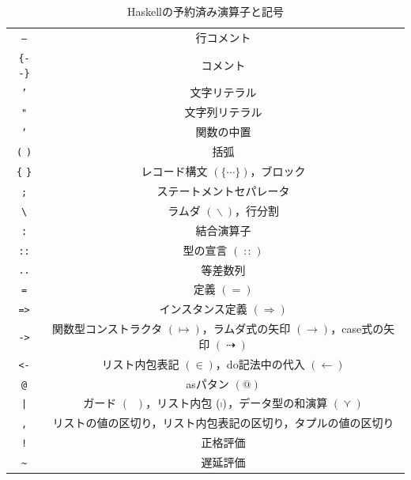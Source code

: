 \documentclass[a5paper,twoside,fleqn]{jsbook}
\newcommand{\programminglanguage}[1]{\textsf{#1}}
\newcommand{\haskell}{\programminglanguage{Haskell}}
\newcommand{\code}[1]{\texttt{#1}}
\DeclareMathOperator{\mSuperClass}{\Rightarrow}
\DeclareMathOperator{\mDoEq}{\leftarrow}
\DeclareMathOperator{\mFrom}{\in}
\DeclareMathOperator{\mIfSo}{\dashrightarrow}
\DeclareMathOperator{\mIn}{{:\!:}}
\DeclareMathOperator{\mLambda}{\backslash}
\DeclareMathOperator{\mValueOr}{\curlyvee}
\newcommand{\mGuard}[1]{\mathop{\mid_{#1}}}
\newcommand{\mListComp}[1]{\shortmid#1}
\begin{document}
\begin{table}
\caption{\haskell の予約済み演算子と記号}
\label{tab:reserved-symbols}
\begin{center}
\begin{tabular}{||c|c||}
\hline
\code{--}&行コメント\\
\code{\{-} \code{-\}}&コメント\\
\hline
\code{'}&文字リテラル\\
\code{"}&文字列リテラル\\%
\code{`}&関数の中置\\
\code{(} \code{)}&括弧\\
\code{\{} \code{\}}&レコード構文 $(\{\dotsb\})$，ブロック\\
\code{;}&ステートメントセパレータ\\
\hline
\code{\textbackslash}&ラムダ $(\mLambda)$，行分割\\
\code{:}&結合演算子\\
\code{::}&型の宣言 $(\mIn)$\\
\code{..}&等差数列\\
\code{=}&定義 $(=)$\\
\code{=>}&インスタンス定義 $(\mSuperClass)$\\
\code{->}&関数型コンストラクタ $(\mapsto)$，ラムダ式の矢印 $(\rightarrow)$，case式の矢印 $(\mIfSo)$\\
\code{<-}&リスト内包表記 $(\mFrom)$，do記法中の代入 $(\mDoEq)$\\
\code{@}&asパタン $(@)$\\
\code{|}&ガード $(\mGuard{})$，リスト内包 $(\mListComp)$，データ型の和演算 $(\mValueOr)$\\
\code{,}&リストの値の区切り，リスト内包表記の区切り，タプルの値の区切り\\
\hline
\code{!}&正格評価\\
\code{\textasciitilde}&遅延評価\\
\hline
\end{tabular}
\end{center}
\end{table}
\end{document}
